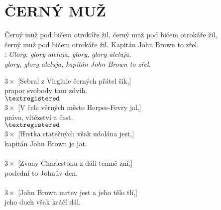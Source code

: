 \section*{\Huge ČERNÝ MUŽ}

Černý muž pod bičem otrokáře žil, černý muž pod bičem otrokáře žil,\\
černý muž pod bičem otrokáře žil. Kapitán John Brown to zřel.\\
 
\textregistered:
\emph{
Glory, glory aleluja, glory, glory aleluja,\\
glory, glory aleluja, kapitán John Brown to zřel.\\
}

$3\times$ [Sebral z Virginie černých přátel šik,]\\
prapor svobody tam zdvih.\\
$\textregistered$\\

$3\times$ [V čele věrných město Herpes-Fevry jal,]\\
právo, vítězství a čest.\\
$\textregistered$\\

$3\times$ [Hrstka statečných však udolána jest,]\\
kapitán John Brown je jat.\\
\textregistered\\

$3\times$ [Zvony Charlestonu z dáli temně zní,]\\
poslední to Johnův den.\\
\textregistered\\

$3\times$ [John Brown mrtev jest a jeho tělo tlí,]\\
jeho duch však kráčí dál.\\
\textregistered

\newpage
